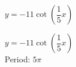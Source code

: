 {$y = -11\cot \left( \dfrac{1}{5} x \right)$}
{$y = -11\cot \left( \dfrac{1}{5} x \right)$\\
Period: $5\pi$

\begin{center}
\end{center}
}
